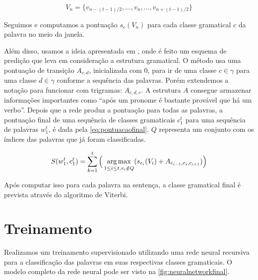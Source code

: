 \begin{equation} \label{eq:janeladevets}
V_n = \big\{ v_{n - (t-1)/2}, ..., v_n, ..., v_{{n + (t-1)/2}} \big\}
\end{equation}

Seguimos \cite{fonseca2015evaluating} e computamos a pontuação $s_c(V_n)$ para cada classe gramatical $c$ da palavra no meio da janela. 


Além disso, usamos a ideia apresentada em \cite{collobert2011natural}, onde é feito um esquema de predição que leva em consideração a estrutura gramatical. O método usa uma pontuação de transição $A_{c,d}$, inicializada com 0, para ir de uma classe $c \in \gamma$ para uma classe $d \in \gamma$ conforme a sequência das palavras. Porém extendemos a notação para funcionar com trigramas: $A_{c,d,e}$. A estrutura $A$ consegue armazenar informações importantes como ``após um pronome é bastante provável que há um verbo''. Depois que a rede produz a pontuação para todas as palavras, a pontuação final de uma sequência de classes gramaticais $c_1^t$ para uma sequência de palavras $w_1^t$, é dada pela \autoref{eq:pontuacaofinal}. $Q$ representa um conjunto com os índices das palavras que já foram classificadas.

\begin{equation} \label{eq:pontuacaofinal}
S(w_1^t, c_1^t) = \sum\limits_{k=1}^{t} \Big( \operatorname*{arg\,max}_{1 \leq i \leq t, v_i \notin Q} (s_{c_i}(V_i) + A_{c_{i-1}, c_{i}, c_{i+1}}) \Big)
\end{equation}

Após computar isso para cada palavra na sentença, a classe gramatical final é prevista através do algoritmo de Viterbi.


\section{Treinamento}

Realizamos um treinamento supervisionado utilizando uma rede neural recursiva para a classificação das palavras em suas respectivas classes gramaticais. O modelo completo da rede neural pode ser visto na \autoref{fig:neuralnetworkfinal}.

